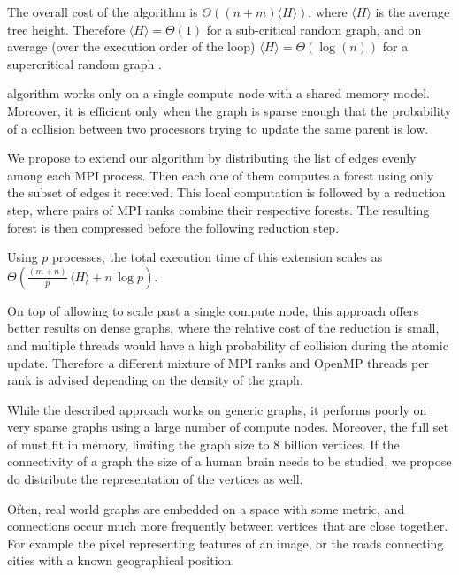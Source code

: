 The overall cost of the algorithm is $\Theta((n +
m)\langle H \rangle)$, where $\langle H \rangle$
is the average tree height. Therefore $\langle H \rangle = \Theta(1)$ for a sub-critical random graph,
and on average (over the execution order of the loop) $\langle H
\rangle = \Theta(\log(n))$
for a supercritical random graph \cite{RandomGraph}.

 algorithm \label{algorithm:cc2} works only on a single compute node with a shared memory model.
Moreover, it is efficient
only when the graph is sparse enough that the
probability of a collision between two processors
trying to update the same parent is low.

We propose to extend our algorithm by distributing the list of edges evenly among each MPI
process. %
Then each one of them computes a forest using only the subset of edges it
received. This local
computation
is followed by a reduction step, where pairs of MPI ranks combine their respective
forests.
The resulting forest is then compressed before the following reduction step.

Using $p$ processes, the total execution time of this extension scales as $\Theta(\frac{(m +
n)}{p}\, \langle H \rangle + n\,\log p)$.

On top of allowing to scale past a single compute node, this approach offers better results on
dense graphs, where the relative cost of the reduction is small, and multiple threads would have
a high probability of collision during the atomic update.
Therefore a different mixture of MPI ranks and OpenMP threads per rank is advised depending on the
density of the graph.

\label{section:distributed}
While the described approach works on generic graphs, it performs poorly on very sparse graphs using
a large number of compute nodes. Moreover, the full set of  must fit in memory, limiting
the graph size to $8$ billion vertices. If the connectivity of a graph the size of a human brain needs
to be studied,
we propose do distribute the representation of the vertices as well.

Often, real world graphs are embedded on a space with some metric, and connections
occur much more frequently between
vertices that are close together. For example the pixel representing features of an
image, or the roads connecting cities
with a known geographical position.

